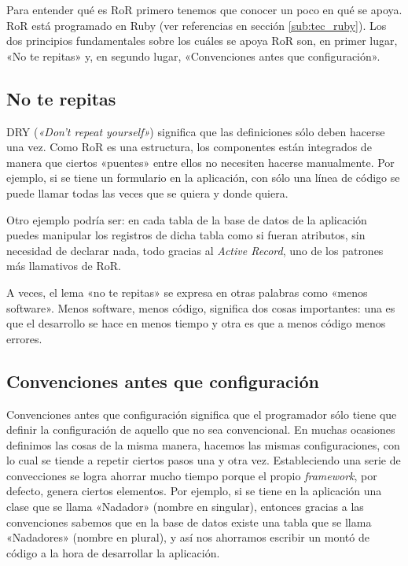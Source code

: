   Para entender qué es RoR primero tenemos que conocer un poco en qué se apoya. RoR está programado en Ruby (ver referencias en sección \ref{sub:tec_ruby}). Los dos principios fundamentales sobre los cuáles se apoya RoR son, en primer lugar, «No te repitas» y, en segundo lugar, «Convenciones antes que configuración».
  
  \subsection{No te repitas} %
    \label{sub:ror_no_te_repitas}
    
    DRY ({\it «Don't repeat yourself»}) significa que las definiciones sólo deben hacerse una vez. Como RoR es una estructura, los componentes están integrados de manera que ciertos «puentes» entre ellos no necesiten hacerse manualmente. Por ejemplo, si se tiene un formulario en la aplicación, con sólo una línea de código se puede llamar todas las veces que se quiera y donde quiera. 
    
    Otro ejemplo podría ser: en cada  tabla de la base de datos de la aplicación puedes manipular los registros de dicha tabla como si fueran atributos, sin necesidad de declarar nada, todo gracias al {\it Active Record}, uno de los patrones más llamativos de RoR.
    
    A veces, el lema «no te repitas» se expresa en otras palabras como «menos software». Menos software, menos código, significa dos cosas importantes: una es que el desarrollo se hace en menos tiempo y otra es que a menos código menos errores.
  
  \subsection{Convenciones antes que configuración} %
    \label{sub:ror_convenciones_antes_que_configuracion}
    
    Convenciones antes que configuración significa que el programador sólo tiene que definir la configuración de aquello que no sea convencional. En muchas ocasiones definimos las cosas de la misma manera, hacemos las mismas configuraciones, con lo cual se tiende a repetir ciertos pasos una y otra vez. Estableciendo una serie de convecciones se logra ahorrar mucho tiempo porque el propio {\it framework}, por defecto, genera ciertos elementos. Por ejemplo, si se tiene en la aplicación una clase que se llama «Nadador» (nombre en singular), entonces gracias a las convenciones sabemos que en la base de datos existe una tabla que se llama «Nadadores» (nombre en plural), y así nos ahorramos escribir un montó de código a la hora de desarrollar la aplicación.
    
